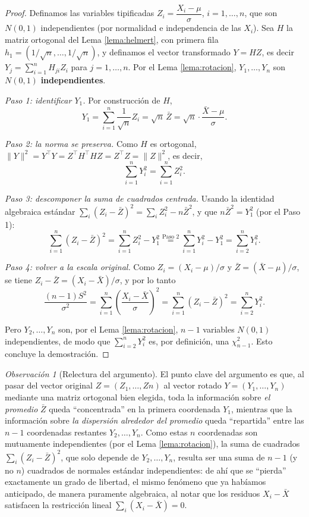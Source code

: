 \documentclass[11pt,a4paper]{article}
\theoremstyle{plain}
\theoremstyle{definition}
\theoremstyle{remark}
\newtheorem{observacion}[teorema]{Observación}
\begin{document}
\begin{proof}
Definamos las variables tipificadas $Z_i = \dfrac{X_i-\mu}{\sigma}$, $i=1,\dots,n$, que son $N(0,1)$ independientes (por normalidad e independencia de las $X_i$). Sea $H$ la matriz ortogonal del Lema \ref{lema:helmert}, con primera fila $h_1=(1/\sqrt n,\dots,1/\sqrt n)$, y definamos el vector transformado $Y=HZ$, es decir $Y_j = \sum_{i=1}^n H_{ji}Z_i$ para $j=1,\dots,n$. Por el Lema \ref{lema:rotacion}, $Y_1,\dots,Y_n$ son $N(0,1)$ \textbf{independientes}.

\emph{Paso 1: identificar $Y_1$.} Por construcción de $H$,
$$Y_1 = \sum_{i=1}^n \frac{1}{\sqrt n} Z_i = \sqrt n\, \bar Z = \sqrt n \cdot \frac{\bar X - \mu}{\sigma}.$$

\emph{Paso 2: la norma se preserva.} Como $H$ es ortogonal, $\|Y\|^2 = Y^\top Y = Z^\top H^\top H Z = Z^\top Z = \|Z\|^2$, es decir,
$$\sum_{i=1}^n Y_i^2 = \sum_{i=1}^n Z_i^2.$$

\emph{Paso 3: descomponer la suma de cuadrados centrada.} Usando la identidad algebraica estándar $\sum_i (Z_i-\bar Z)^2 = \sum_i Z_i^2 - n\bar Z^2$, y que $n\bar Z^2 = Y_1^2$ (por el Paso 1):
$$\sum_{i=1}^n (Z_i-\bar Z)^2 = \sum_{i=1}^n Z_i^2 - Y_1^2 \overset{\text{Paso 2}}{=} \sum_{i=1}^n Y_i^2 - Y_1^2 = \sum_{i=2}^n Y_i^2.$$

\emph{Paso 4: volver a la escala original.} Como $Z_i = (X_i-\mu)/\sigma$ y $\bar Z = (\bar X-\mu)/\sigma$, se tiene $Z_i - \bar Z = (X_i-\bar X)/\sigma$, y por lo tanto
$$\frac{(n-1)S^2}{\sigma^2} = \sum_{i=1}^n \left(\frac{X_i-\bar X}{\sigma}\right)^2 = \sum_{i=1}^n (Z_i-\bar Z)^2 = \sum_{i=2}^n Y_i^2.$$

Pero $Y_2,\dots,Y_n$ son, por el Lema \ref{lema:rotacion}, $n-1$ variables $N(0,1)$ independientes, de modo que $\sum_{i=2}^n Y_i^2$ es, por definición, una $\chi^2_{n-1}$. Esto concluye la demostración. \qedhere
\end{proof}

\begin{observacion}[Relectura del argumento]
El punto clave del argumento es que, al pasar del vector original $Z=(Z_1,\dots,Zn)$ al vector rotado $Y=(Y_1,\dots,Y_n)$ mediante una matriz ortogonal bien elegida, toda la información sobre \emph{el promedio} $\bar Z$ queda ``concentrada'' en la primera coordenada $Y_1$, mientras que la información sobre \emph{la dispersión alrededor del promedio} queda ``repartida'' entre las $n-1$ coordenadas restantes $Y_2,\dots,Y_n$. Como estas $n$ coordenadas son mutuamente independientes (por el Lema \ref{lema:rotacion}), la suma de cuadrados $\sum_i(Z_i-\bar Z)^2$, que solo depende de $Y_2,\dots,Y_n$, resulta ser una suma de $n-1$ (y no $n$) cuadrados de normales estándar independientes: de ahí que se ``pierda'' exactamente un grado de libertad, el mismo fenómeno que ya habíamos anticipado, de manera puramente algebraica, al notar que los residuos $X_i-\bar X$ satisfacen la restricción lineal $\sum_i(X_i-\bar X)=0$.
\end{observacion}
\end{document}
